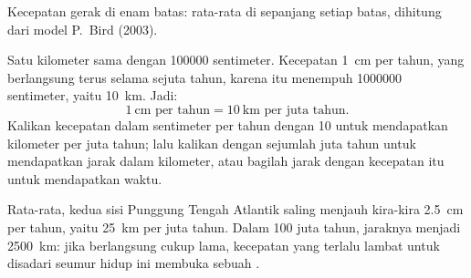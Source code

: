\begin{omfigure}

{\small Kecepatan gerak  di enam batas: rata-rata di sepanjang setiap
batas, dihitung dari model  P.~Bird (2003).}
\end{omfigure}

\begin{method}\label{met:g7:plate-tectonics:convert}
Satu kilometer sama dengan \num{100000} sentimeter. Kecepatan \qty{1}{cm}
per tahun, yang berlangsung terus selama sejuta tahun, karena itu menempuh
\num{1000000} sentimeter, yaitu \qty{10}{km}. Jadi:
\[
  1\ \text{cm per tahun} = 10\ \text{km per juta tahun}.
\]
Kalikan kecepatan dalam sentimeter per tahun dengan 10 untuk mendapatkan
kilometer per juta tahun; lalu kalikan dengan sejumlah juta tahun untuk
mendapatkan jarak dalam kilometer, atau bagilah jarak dengan kecepatan itu
untuk mendapatkan waktu.
\end{method}

\begin{example}\label{ex:g7:plate-tectonics:atlantic}
Rata-rata, kedua sisi Punggung Tengah Atlantik saling menjauh kira-kira
\qty{2.5}{cm} per tahun, yaitu \qty{25}{km} per juta tahun. Dalam 100 juta
tahun, jaraknya menjadi \qty{2500}{km}: jika berlangsung cukup lama,
kecepatan yang terlalu lambat untuk disadari seumur hidup ini membuka
sebuah .
\end{example}

